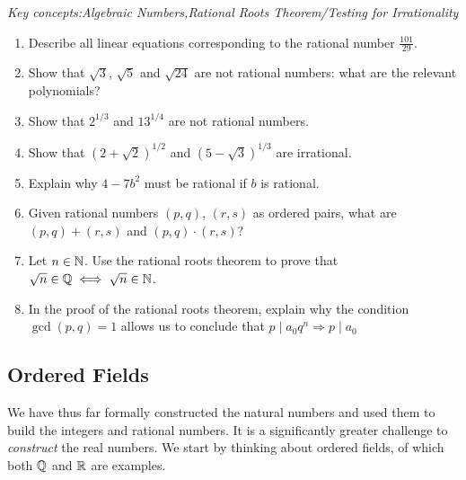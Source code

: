 \begin{exercises}{}
	\emph{Key concepts:\quad Algebraic Numbers,\quad Rational Roots Theorem/Testing for Irrationality}

	\begin{enumerate}
	  \item Describe all linear equations corresponding to the rational number $\frac{101}{29}$.
	  
	  \item %
	  Show that $\sqrt 3$, $\sqrt 5$ and $\sqrt{24}$ are not rational numbers: what are the relevant polynomials?
	  
	  
	  \item %
	  Show that $2^{1/3}$ and $13^{1/4}$ are not rational numbers.
	
	
	  \item%
	  Show that $(2+\sqrt 2)^{1/2}$ and $(5-\sqrt 3)^{1/3}$ are irrational.
	  
	  
	  
	  
	  
	  
	  \item%
	  Explain why $4-7b^2$ must be rational if $b$ is rational.
	  
	  
	  \item\label{exs:ratnumber+x} Given rational numbers $(p,q)$, $(r,s)$ as ordered pairs, what are $(p,q)+(r,s)$ and $(p,q)\cdot(r,s)$?
	  
	  
	  \item Let $n\in\mathbb{N}$. Use the rational roots theorem to prove that $\sqrt n\in\mathbb{Q}\iff \sqrt n\in\mathbb{N}$.
	  
	  
	  \item In the proof of the rational roots theorem, explain why the condition $\gcd(p,q)=1$ allows us to conclude that $p\mid a_0q^n\Longrightarrow p\mid a_0$
	\end{enumerate}
\end{exercises}


\clearpage



\subsection{Ordered Fields}

We have thus far formally constructed the natural numbers and used them to build the integers and rational numbers. It is a significantly greater challenge to \emph{construct} the real numbers. We start by thinking about ordered fields, of which both $\mathbb{Q}$ and $\mathbb{R}$ are examples.

